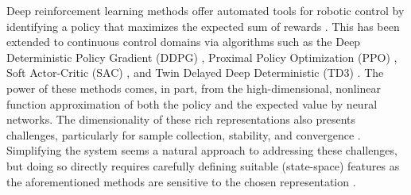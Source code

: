 \documentclass[letterpaper, 10 pt, conference]{ieeeconf}
\begin{document}
Deep reinforcement learning methods offer automated tools for robotic control by identifying a policy that maximizes the expected sum of rewards \cite{henderson2018deep}.
This has been extended to continuous control domains via algorithms such as the Deep Deterministic Policy Gradient (DDPG) \cite{DDPG}, Proximal Policy Optimization (PPO) \cite{PPO}, Soft Actor-Critic (SAC) \cite{SAC}, and Twin Delayed Deep Deterministic (TD3) \cite{TD3}.
The power of these methods comes, in part, from the high-dimensional, nonlinear function approximation of both the policy and the expected value by neural networks.
The dimensionality of these rich representations also presents challenges, particularly for sample collection, stability, and convergence \cite{Islam2017}.
Simplifying the system seems a natural approach to addressing these challenges, but doing so directly requires carefully defining suitable (state-space) features as the aforementioned methods are sensitive to the chosen representation \cite{bhatnagar2009convergent}.  
\end{document}
